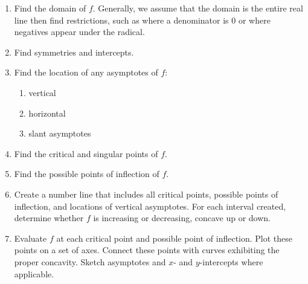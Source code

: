 \begin{enumerate}
\item		Find the domain of $f$. Generally, we assume that the domain is the entire real line then find restrictions, such as where a denominator is 0 or where negatives appear under the radical.
\item Find symmetries and intercepts.
\item		Find the location of any asymptotes of $f$:
\begin{enumerate}
\item vertical
\item horizontal 
\item slant asymptotes
\end{enumerate}
\item		Find the critical and singular points of $f$.
\item		Find the possible points of inflection of $f$.
\item		Create a number line that includes all critical points, possible points of inflection, and locations of vertical asymptotes. For each interval created, determine whether $f$ is increasing or decreasing, concave up or down.
\item		Evaluate $f$ at each critical point and possible point of inflection. Plot these points on a set of axes. Connect these points with curves exhibiting the proper concavity. Sketch asymptotes and $x$- and $y$-intercepts where applicable.
\end{enumerate}

